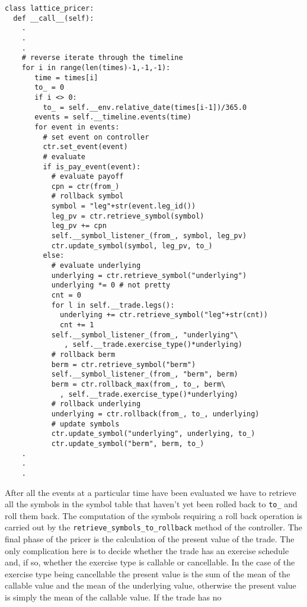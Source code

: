 \begin{verbatim}
class lattice_pricer:
  def __call__(self):
    .
    .
    .
    # reverse iterate through the timeline
    for i in range(len(times)-1,-1,-1):
       time = times[i]
       to_ = 0
       if i <> 0:
         to_ = self.__env.relative_date(times[i-1])/365.0
       events = self.__timeline.events(time)
       for event in events:
         # set event on controller
         ctr.set_event(event)
         # evaluate
         if is_pay_event(event):
           # evaluate payoff
           cpn = ctr(from_)
           # rollback symbol
           symbol = "leg"+str(event.leg_id())
           leg_pv = ctr.retrieve_symbol(symbol) 
           leg_pv += cpn        
           self.__symbol_listener_(from_, symbol, leg_pv)
           ctr.update_symbol(symbol, leg_pv, to_)           
         else:
           # evaluate underlying             
           underlying = ctr.retrieve_symbol("underlying")
           underlying *= 0 # not pretty
           cnt = 0
           for l in self.__trade.legs():
             underlying += ctr.retrieve_symbol("leg"+str(cnt))         
             cnt += 1
           self.__symbol_listener_(from_, "underlying"\
              , self.__trade.exercise_type()*underlying)
           # rollback berm
           berm = ctr.retrieve_symbol("berm")
           self.__symbol_listener_(from_, "berm", berm)
           berm = ctr.rollback_max(from_, to_, berm\
             , self.__trade.exercise_type()*underlying)
           # rollback underlying
           underlying = ctr.rollback(from_, to_, underlying)
           # update symbols
           ctr.update_symbol("underlying", underlying, to_)
           ctr.update_symbol("berm", berm, to_)
    .
    .
    .
\end{verbatim}
After all the events at a particular time have been evaluated we have
to retrieve all the symbols in the symbol table that haven't yet been
rolled back to \verb|to_| and roll them back. The computation of the
symbols requiring a roll back operation is carried out by the
\verb|retrieve_symbols_to_rollback| method of the controller. The
final phase of the pricer is the calculation of the present value of
the trade. The only complication here is to decide whether the trade
has an exercise schedule and, if so, whether the exercise type is
callable or cancellable. In the case of the exercise type being
cancellable the present value is the sum of the mean of the callable
value and the mean of the underlying value, otherwise the present
value is simply the mean of the callable value. If the trade has no
